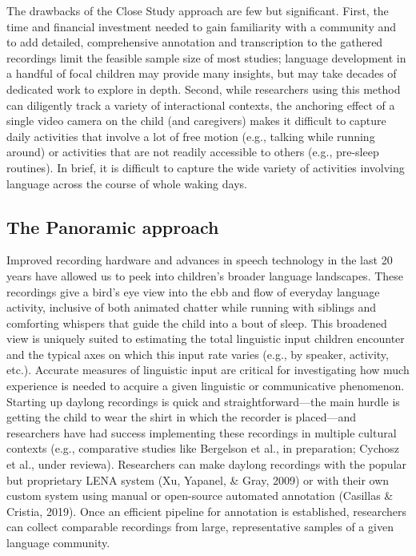 \documentclass[,man,floatsintext]{apa6}
\begin{document}
The drawbacks of the Close Study approach are few but significant.
First, the time and financial investment needed to gain familiarity with
a community and to add detailed, comprehensive annotation and
transcription to the gathered recordings limit the feasible sample size
of most studies; language development in a handful of focal children may
provide many insights, but may take decades of dedicated work to explore
in depth. Second, while researchers using this method can diligently
track a variety of interactional contexts, the anchoring effect of a
single video camera on the child (and caregivers) makes it difficult to
capture daily activities that involve a lot of free motion (e.g.,
talking while running around) or activities that are not readily
accessible to others (e.g., pre-sleep routines). In brief, it is
difficult to capture the wide variety of activities involving language
across the course of whole waking days.

\subsection{The Panoramic approach}\label{the-panoramic-approach}

Improved recording hardware and advances in speech technology in the
last 20 years have allowed us to peek into children's broader language
landscapes. These recordings give a bird's eye view into the ebb and
flow of everyday language activity, inclusive of both animated chatter
while running with siblings and comforting whispers that guide the child
into a bout of sleep. This broadened view is uniquely suited to
estimating the total linguistic input children encounter and the typical
axes on which this input rate varies (e.g., by speaker, activity, etc.).
Accurate measures of linguistic input are critical for investigating how
much experience is needed to acquire a given linguistic or communicative
phenomenon. Starting up daylong recordings is quick and
straightforward---the main hurdle is getting the child to wear the shirt
in which the recorder is placed---and researchers have had success
implementing these recordings in multiple cultural contexts (e.g.,
comparative studies like Bergelson et al., in preparation; Cychosz et
al., under reviewa). Researchers can make daylong recordings with the
popular but proprietary LENA system (Xu, Yapanel, \& Gray, 2009) or with
their own custom system using manual or open-source automated annotation
(Casillas \& Cristia, 2019). Once an efficient pipeline for annotation
is established, researchers can collect comparable recordings from
large, representative samples of a given language community.
\end{document}
